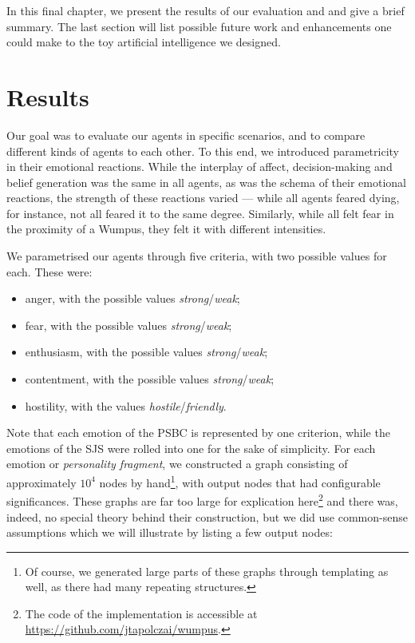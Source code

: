 In this final chapter, we present the results of our evaluation and and give a brief summary. The last section will list possible future work and enhancements one could make to the toy artificial intelligence we designed.

\section{Results}\label{sec:results}

Our goal was to evaluate our agents in specific scenarios, and to compare different kinds of agents to each other. To this end, we introduced parametricity in their emotional reactions. While the interplay of affect, decision-making and belief generation was the same in all agents, as was the schema of their emotional reactions, the strength of these reactions varied --- while all agents feared dying, for instance, not all feared it to the same degree. Similarly, while all felt fear in the proximity of a Wumpus, they felt it with different intensities.

We parametrised our agents through five criteria, with two possible values for each. These were:

\begin{itemize}
	\item anger, with the possible values \emph{strong}/\emph{weak};
	\item fear, with the possible values \emph{strong}/\emph{weak};
	\item enthusiasm, with the possible values \emph{strong}/\emph{weak};
	\item contentment, with the possible values \emph{strong}/\emph{weak};
	\item hostility, with the values \emph{hostile}/\emph{friendly}.
\end{itemize}

Note that each emotion of the PSBC is represented by one criterion, while the emotions of the SJS were rolled into one for the sake of simplicity. For each emotion or \emph{personality fragment}, we constructed a graph consisting of approximately $10^4$ nodes by hand\footnote{Of course, we generated large parts of these graphs through templating as well, as there had many repeating structures.}, with output nodes that had configurable significances. These graphs are far too large for explication here\footnote{The code of the implementation is accessible at \url{https://github.com/jtapolczai/wumpus}.} and there was, indeed, no special theory behind their construction, but we did use common-sense assumptions which we will illustrate by listing a few output nodes:


